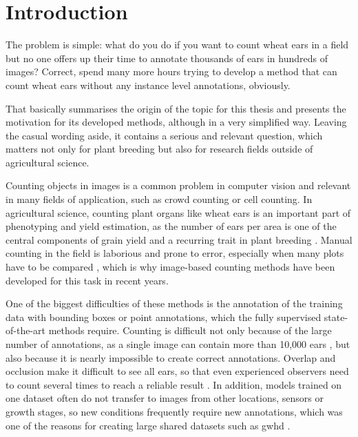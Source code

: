 \documentclass[12pt,parskip = half, DIV=classic,listof=totoc]{scrartcl}
\begin{document}



	\section{Introduction}
		The problem is simple: what do you do if you want to count wheat ears in a field but no one offers up 
		their time to annotate thousands of ears in hundreds of images? Correct, spend many more hours trying 
		to develop a method that can count wheat ears without any instance level annotations, obviously.

		That basically summarises the origin of the topic for this thesis and presents the motivation for its developed methods,
		although in a very simplified way. Leaving the casual wording aside, it contains a serious and relevant question, 
		which matters not only for plant breeding but also for research fields outside of agricultural science.

		Counting objects in images is a common problem in computer vision and relevant in many fields of application, 
		such as crowd counting or cell counting. In agricultural science, counting plant organs like wheat ears is an 
		important part of phenotyping and yield estimation, as the number of ears per area is one of the central components 
		of grain yield and a recurring trait in plant breeding \cite{guoAerialImageryAnalysis2018, madecEarDensityEstimation2019}. 
		Manual counting in the field is laborious and prone to error, especially when many plots have to be compared 
		\cite{madecEarDensityEstimation2019, guoAerialImageryAnalysis2018}, which is why image-based counting methods have been developed for this task 
		in recent years. 

		One of the biggest difficulties of these methods is the annotation of the training data with bounding boxes or 
		point annotations, which the fully supervised state-of-the-art methods require. Counting is difficult not only because 
		of the large number of annotations, as a single image can contain more than 10,000 ears 
		\cite{xiongTasselNetv2InfieldCounting2019}, but also because it is nearly impossible to create correct annotations. 
		Overlap and occlusion make it difficult to see all ears, so that even experienced observers need to count several 
		times to reach a reliable result \cite{xiongTasselNetv2InfieldCounting2019}. In addition, models trained on one 
		dataset often do not transfer to images from other locations, sensors or growth stages, so new conditions 
		frequently require new annotations, which was one of the reasons for creating large shared datasets such as 
		\ac{gwhd} \cite{davidGlobalWheatHead2021}.
\end{document}
